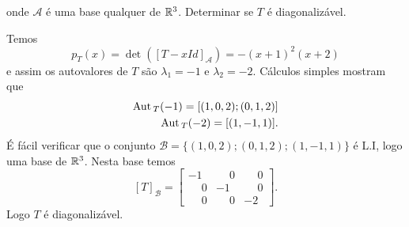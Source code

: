 \begin{exemplo}
\begin{enumerate}[label={\arabic*})]
\[        \]
        onde $\mathcal{A}$ \'e uma base qualquer de $\mathbb{R}^3$. Determinar se $T$ \'e diagonaliz\'avel.
        \begin{solucao}
        Temos
        \[
                p_T(x) = \det([T - xId]_\mathcal{A}) = -(x + 1)^2(x + 2)
            \]
            e assim os autovalores de $T$ s\~ao $\lambda_1 = -1$ e $\lambda_2 = -2$. C\'alculos simples mostram que
            \begin{align*}
                {\rm Aut\,}_T(-1) = [(1,0,2); (0,1,2)]\\
                {\rm Aut\,}_T(-2) = [(1,-1,1)].
            \end{align*}
            \'E f\'acil verificar que o conjunto $\mathcal{B} = \{(1,0,2); (0,1,2); (1,-1,1)\}$ \'e L.I, logo uma base de $\mathbb{R}^3$. Nesta base temos
            \[
                [T]_\mathcal{B} = \begin{bmatrix}
                                -1 & \phantom{-}0 & \phantom{-}0\\
                                \phantom{-}0 & -1 & \phantom{-}0\\
                                \phantom{-}0 & \phantom{-}0 & -2
                            \end{bmatrix}.
            \]
            Logo $T$ \'e diagonaliz\'avel.
        \end{solucao}
    \end{enumerate}
\end{exemplo}

